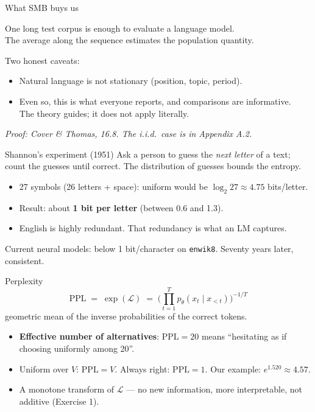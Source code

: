 \documentclass[11pt,aspectratio=169]{beamer}
\newcommand{\Lc}{\mathcal{L}}
\newcommand{\PPL}{\mathrm{PPL}}
\newcommand{\ptheta}{p_{\theta}}
\newcommand{\dest}[1]{\textcolor{structure}{\textbf{#1}}}
\newcommand{\hook}[1]{{\small\textcolor{gray!60!black}{\textit{#1}}}}
\begin{document}
\begin{frame}{What SMB buys us}
  \begin{block}{}
    One long test corpus is enough to evaluate a language model.\\
    The average along the sequence estimates the population quantity.
  \end{block}

  \vspace{1em}
  Two honest caveats:
  \begin{itemize}
    \item Natural language is not stationary (position, topic, period).
    \item Even so, this is what everyone reports, and comparisons are informative.\\
          The theory guides; it does not apply literally.
  \end{itemize}

  \vspace{0.6em}
  \hook{Proof: Cover \& Thomas, 16.8. The i.i.d.\ case is in Appendix A.2.}
\end{frame}

\begin{frame}{Shannon's experiment (1951)}
  Ask a person to guess the \emph{next letter} of a text; count the guesses until correct.
  The distribution of guesses bounds the entropy.

  \vspace{1em}
  \begin{itemize}
    \item 27 symbols (26 letters + space): uniform would be $\log_2 27\approx 4.75$
          bits/letter.
    \item Result: about \dest{1 bit per letter} (between 0.6 and 1.3).
    \item English is highly redundant. That redundancy is what an LM captures.
  \end{itemize}

  \vspace{1em}
  Current neural models: below 1 bit/character on \texttt{enwik8}. Seventy years later,
  consistent.
\end{frame}

\begin{frame}{Perplexity}
  \[
    \PPL \;=\; \exp(\Lc) \;=\; \Big(\prod_{t=1}^{T}\ptheta(x_t\mid x_{<t})\Big)^{-1/T}
  \]
  geometric mean of the inverse probabilities of the correct tokens.

  \vspace{0.8em}
  \begin{itemize}
    \item \dest{Effective number of alternatives}: $\PPL = 20$ means ``hesitating as if
          choosing uniformly among 20''.
    \item Uniform over $V$: $\PPL = V$. Always right: $\PPL = 1$. Our example:
          $e^{1.520}\approx 4.57$.
    \item A monotone transform of $\Lc$ --- no new information, more interpretable,
          not additive (Exercise 1).
  \end{itemize}
\end{frame}
\end{document}
